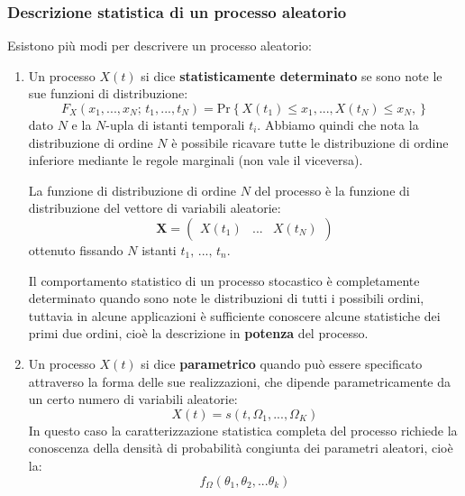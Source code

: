 \documentclass[a4paper,11pt]{article}
\begin{document}
\subsubsection{Descrizione statistica di un processo aleatorio}
Esistono più modi per descrivere un processo aleatorio:
\begin{enumerate}
\item
Un processo $X(t)$ si dice \textbf{statisticamente determinato} se sono note le sue funzioni di distribuzione:
$$
F_X(x_1, ..., x_N; \, t_1, ..., t_N) = \mathrm{Pr} \left\{ X(t_1) \leq x_1, ..., X(t_N) \leq x_N,  \right\}
$$
dato $N$ e la $N$-upla di istanti temporali $t_i$. Abbiamo quindi che nota la distribuzione di ordine $N$ è possibile ricavare tutte le distribuzione di ordine inferiore mediante le regole marginali (non vale il viceversa).

La funzione di distribuzione di ordine $N$ del processo è la funzione di distribuzione del vettore di variabili aleatorie:
$$
\mathbf{X} = \begin{pmatrix}
	X(t_1) & ... & X(t_N)
\end{pmatrix} 
$$
ottenuto fissando $N$ istanti $t_1, \, ..., \, t_n$.

Il comportamento statistico di un processo stocastico è completamente determinato quando sono note le distribuzioni di tutti i possibili ordini, tuttavia in
alcune applicazioni è sufficiente conoscere alcune statistiche dei primi due ordini, cioè la descrizione in \textbf{potenza} del processo.

\item
Un processo $X(t)$ si dice \textbf{parametrico} quando può essere specificato attraverso la forma delle sue realizzazioni, che dipende parametricamente da un certo numero di variabili aleatorie:
$$
X(t) = s(t, \Omega_1, ..., \Omega_K)
$$
In questo caso la caratterizzazione statistica completa del processo richiede la conoscenza della densità di probabilità congiunta dei parametri aleatori, cioè la:
$$
f_\Omega(\theta_1, \theta_2, ... \theta_k)
$$

\end{enumerate}
\end{document}
